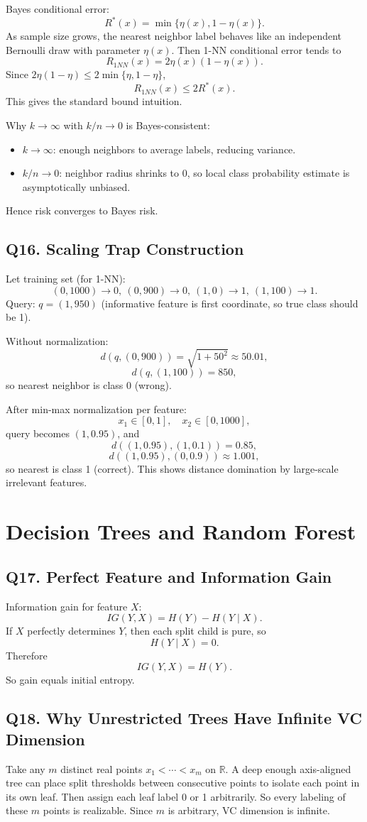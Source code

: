 \documentclass[11pt]{article}
\newcommand{\R}{\mathbb{R}}
\newcommand{\1}{\mathbf{1}}
\begin{document}
Bayes conditional error:
\[
R^*(x)=\min\{\eta(x),1-\eta(x)\}.
\]
As sample size grows, the nearest neighbor label behaves like an independent Bernoulli draw with parameter $\eta(x)$. Then 1-NN conditional error tends to
\[
R_{1NN}(x)=2\eta(x)(1-\eta(x)).
\]
Since $2\eta(1-\eta)\le2\min\{\eta,1-\eta\}$,
\[
R_{1NN}(x)\le 2R^*(x).
\]
This gives the standard bound intuition.

Why $k\to\infty$ with $k/n\to0$ is Bayes-consistent:
\begin{itemize}
\item $k\to\infty$: enough neighbors to average labels, reducing variance.
\item $k/n\to0$: neighbor radius shrinks to $0$, so local class probability estimate is asymptotically unbiased.
\end{itemize}
Hence risk converges to Bayes risk.

\subsection*{Q16. Scaling Trap Construction}
Let training set (for 1-NN):
\[
(0,1000)\to0,\ (0,900)\to0,\ (1,0)\to1,\ (1,100)\to1.
\]
Query: $q=(1,950)$ (informative feature is first coordinate, so true class should be 1).

Without normalization:
\[
d(q,(0,900))=\sqrt{1+50^2}\approx50.01,
\]
\[
d(q,(1,100))=850,
\]
so nearest neighbor is class 0 (wrong).

After min-max normalization per feature:
\[
x_1\in[0,1],\quad x_2\in[0,1000],
\]
query becomes $(1,0.95)$, and
\[
d((1,0.95),(1,0.1))=0.85,
\]
\[
d((1,0.95),(0,0.9))\approx1.001,
\]
so nearest is class 1 (correct). This shows distance domination by large-scale irrelevant features.

\section{Decision Trees and Random Forest}

\subsection*{Q17. Perfect Feature and Information Gain}
Information gain for feature $X$:
\[
IG(Y,X)=H(Y)-H(Y\mid X).
\]
If $X$ perfectly determines $Y$, then each split child is pure, so
\[
H(Y\mid X)=0.
\]
Therefore
\[
IG(Y,X)=H(Y).
\]
So gain equals initial entropy.

\subsection*{Q18. Why Unrestricted Trees Have Infinite VC Dimension}
Take any $m$ distinct real points $x_1<\cdots<x_m$ on $\R$.
A deep enough axis-aligned tree can place split thresholds between consecutive points to isolate each point in its own leaf. Then assign each leaf label 0 or 1 arbitrarily. So every labeling of these $m$ points is realizable.
Since $m$ is arbitrary, VC dimension is infinite.
\end{document}
